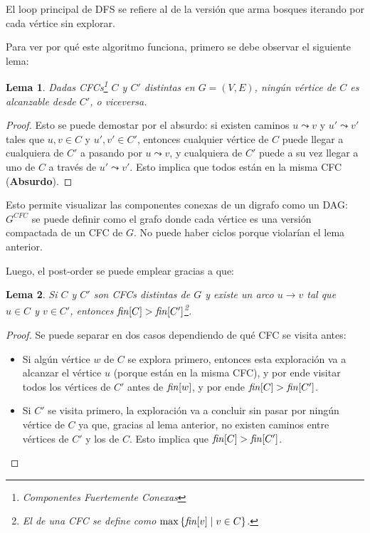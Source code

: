 \documentclass[a4paper]{report}
\newtheorem*{lemma*}{Lema}
\begin{document}
El loop principal de DFS se refiere al de la versión que arma bosques iterando por cada vértice sin explorar.

Para ver por qué este algoritmo funciona, primero se debe observar el siguiente lema:
\begin{lemma*}
    Dadas CFCs\footnote{Componentes Fuertemente Conexas} $C$ y $C'$ distintas en $G = (V, E)$, ningún vértice de $C$ es alcanzable desde $C'$, o viceversa.
\end{lemma*}
\begin{proof}
    Esto se puede demostar por el absurdo: si existen caminos $u \leadsto v$ y $u' \leadsto v'$ tales que $u, v \in C$ y $u', v' \in C'$, entonces cualquier vértice de $C$ puede llegar a cualquiera de $C'$ a pasando por $u \leadsto v$, y cualquiera de $C'$ puede a su vez llegar a uno de $C$ a través de $u' \leadsto v'$. Esto implica que todos están en la misma CFC (\textbf{Absurdo}).

\end{proof}

Esto permite visualizar las componentes conexas de un digrafo como un DAG: $G^{CFC}$ se puede definir como el grafo donde cada vértice es una versión compactada de un CFC de $G$. No puede haber ciclos porque violarían el lema anterior.

Luego, el post-order se puede emplear gracias a que:
\begin{lemma*}
    Si $C$ y $C'$ son CFCs distintas de $G$ y existe un arco $u \rightarrow v$ tal que $u \in C$ y $v \in C'$, entonces $\id{fin}[C] > \id{fin}[C']$\footnote{El  de una CFC se define como $\max{\{\id{fin}[v] \mid v \in C\}}$.}.
\end{lemma*}
\begin{proof}
    Se puede separar en dos casos dependiendo de qué CFC se visita antes:
    \begin{itemize}
        \item Si algún vértice $w$ de $C$ se explora primero, entonces esta exploración va a alcanzar el vértice $u$ (porque están en la misma CFC), y por ende visitar todos los vértices de $C'$ antes de $\id{fin}[w]$, y por ende $\id{fin}[C] > \id{fin}[C']$.
        \item Si $C'$ se visita primero, la exploración va a concluir sin pasar por ningún vértice de $C$ ya que, gracias al lema anterior, no existen caminos entre vértices de $C'$ y los de $C$. Esto implica que $\id{fin}[C] > \id{fin}[C']$.
    \end{itemize}
\end{proof}
\end{document}
